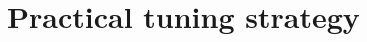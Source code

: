 \documentclass[11pt,a4paper,final]{article}
\numberwithin{equation}{section}
\theoremstyle{remark}
\newtheorem{remark}[theorem]{Remark}
\def\cN{\mathcal N}
\newcommand{\bff}{{\bf f}}
\newcommand{\bI}{{\bf I}}
\newcommand{\bU}{{\bf U}}
\newcommand{\bx}{{\bf x}}
\newcommand{\bX}{{\bf X}}
\newcommand{\bZ}{{\bf Z}}
\newcommand{\bbE}{{\mathbb E}}
\begin{document}


\section{Practical tuning strategy} \label{sec:tuning}




\end{document}
